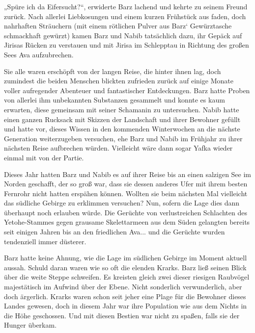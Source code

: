 „Spüre ich da Eifersucht?“, erwiderte Barz lachend und kehrte zu seinem Freund zurück. Nach allerlei Liebkosungen und einem kurzen Frühstück aus faden, doch nahrhaften Sträuchern (mit einem rötlichen Pulver aus Barz‘ Gewürztasche schmackhaft gewürzt) kamen Barz und Nabib tatsächlich dazu, ihr Gepäck auf Jirisas Rücken zu verstauen und mit Jirisa im Schlepptau in Richtung des großen Sees Ava aufzubrechen.

Sie alle waren erschöpft von der langen Reise, die hinter ihnen lag, doch zumindest die beiden Menschen blickten zufrieden zurück auf einige Monate voller aufregender Abenteuer und fantastischer Entdeckungen. Barz hatte Proben von allerlei ihm unbekannten Substanzen gesammelt und konnte es kaum erwarten, diese gemeinsam mit seiner Schamanin zu untersuchen. Nabib hatte einen ganzen Rucksack mit Skizzen der Landschaft und ihrer Bewohner gefüllt und hatte vor, dieses Wissen in den kommenden Winterwochen an die nächste Generation weiterzugeben versuchen, ehe Barz und Nabib im Frühjahr zu ihrer nächsten Reise aufbrechen würden. Vielleicht wäre dann sogar Yafka wieder einmal mit von der Partie.

Dieses Jahr hatten Barz und Nabib es auf ihrer Reise bis an einen salzigen See im Norden geschafft, der so groß war, dass sie dessen anderes Ufer mit ihrem besten Fernrohr nicht hatten erspähen können. Wollten sie beim nächsten Mal vielleicht das südliche Gebirge zu erklimmen versuchen? Nun, sofern die Lage dies dann überhaupt noch erlauben würde. Die Gerüchte von verlustreichen Schlachten des Yetohe-Stammes gegen grausame Skelettarmeen aus dem Süden gelangten bereits seit einigen Jahren bis an den friedlichen Ava... und die Gerüchte wurden tendenziell immer düsterer.

Barz hatte keine Ahnung, wie die Lage im südlichen Gebirge im Moment aktuell aussah. Schuld daran waren wie so oft die elenden Krarks. Barz ließ seinen Blick über die weite Steppe schweifen. Es kreisten gleich zwei dieser riesigen Raubvögel majestätisch im Aufwind über der Ebene. Nicht sonderlich verwunderlich, aber doch ärgerlich. Krarks waren schon seit jeher eine Plage für die Bewohner dieses Landes gewesen, doch in diesem Jahr war ihre Population wie aus dem Nichts in die Höhe geschossen. Und mit diesen Bestien war nicht zu spaßen, falls sie der Hunger überkam.

